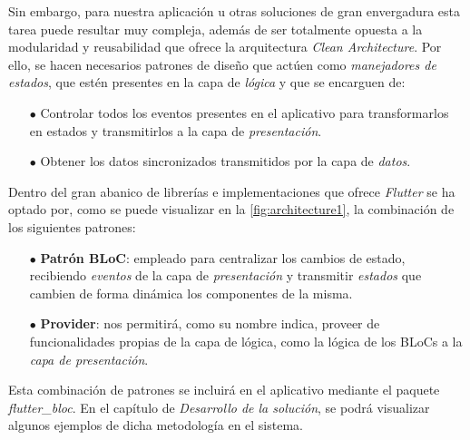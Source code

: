 Sin embargo, para nuestra aplicación u otras soluciones de gran envergadura esta tarea puede resultar muy compleja,
además de ser totalmente opuesta a la modularidad y reusabilidad que ofrece la arquitectura \textit{Clean Architecture}.
Por ello, se hacen necesarios patrones de diseño que actúen como
\textit{manejadores de estados}, que estén presentes en la capa de \textit{lógica} y que se encarguen de:

\begin{itemize}
  \item[$\bullet$] Controlar todos los eventos presentes en el aplicativo 
  para transformarlos en estados y transmitirlos a la capa de \textit{presentación}.
  \item[$\bullet$] Obtener los datos sincronizados transmitidos por la capa de \textit{datos}.
\end{itemize}

Dentro del gran abanico de librerías e implementaciones que ofrece \textit{Flutter} se ha optado por, como se puede 
visualizar en la \autoref{fig:architecture1}, la combinación de los siguientes patrones:

\begin{itemize}
  \item[$\bullet$] \textbf{Patrón BLoC}: empleado para centralizar los cambios de estado, recibiendo \textit{eventos}
   de la capa de \textit{presentación} y transmitir \textit{estados} que cambien de forma dinámica los componentes de
    la misma.
  \item[$\bullet$] \textbf{Provider}: nos permitirá, como su nombre indica, proveer de funcionalidades propias
  de la capa de lógica, como la lógica de los BLoCs a la \textit{capa de presentación}.
\end{itemize}

Esta combinación de patrones se incluirá en el aplicativo mediante el paquete \textit{flutter\_bloc}.
En el capítulo de \textit{Desarrollo de la solución}, se podrá visualizar algunos ejemplos de dicha metodología en
el sistema.
